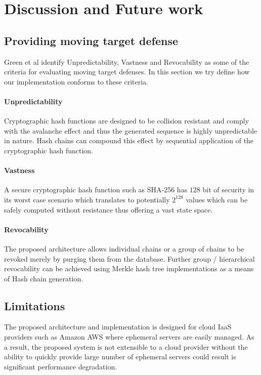 \documentclass{sig-alternate-05-2015}
\begin{document}
\section{Discussion and Future work}
\label{sec:future}

\subsection{Providing moving target defense}

Green et al \cite{green_characterizing_2015} identify Unpredictability, Vastness and Revocability as some of the criteria for evaluating moving target defenses. In this section we try define how our implementation conforms to these criteria.

\paragraph*{Unpredictability} Cryptographic hash functions \cite{rogaway_cryptographic_2004} are designed to be collision resistant and comply with the avalanche effect and thus the generated sequence is highly unpredictable in nature. Hash chains can compound this effect by sequential application of the cryptographic hash function.

\paragraph*{Vastness} A secure cryptographic hash function such as SHA-256 has $128$ bit of security in its worst case scenario which translates to potentially $2^{128}$ values which can be safely computed without resistance thus offering a vast state space.

\paragraph*{Revocability} The proposed architecture allows individual chains or a group of chains to be revoked merely by purging them from the database. Further group / hierarchical revocability can be achieved using Merkle hash tree implementations as a means of Hash chain generation.

\subsection{Limitations}
The proposed architecture and implementation is designed for cloud IaaS providers such as Amazon AWS where ephemeral servers are easily managed.  As a result, the proposed system is not extensible to a cloud provider without the ability to quickly provide large number of ephemeral servers  could result is significant performance degradation.
\end{document}
